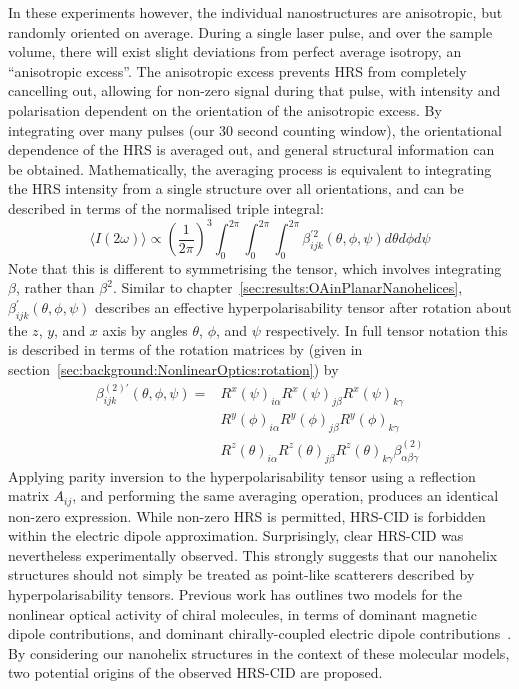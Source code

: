 In these experiments however, the individual nanostructures are anisotropic, but randomly oriented on average. During a single laser pulse, and over the sample volume, there will exist slight deviations from perfect average isotropy, an ``anisotropic excess''. The anisotropic excess prevents HRS from completely cancelling out, allowing for non-zero signal during that pulse, with intensity and polarisation dependent on the orientation of the anisotropic excess. By integrating over many pulses (our 30 second counting window), the orientational dependence of the HRS is averaged out, and general structural information can be obtained.
Mathematically, the averaging process is equivalent to integrating the HRS intensity from a single structure over all orientations, and can be described in terms of the normalised triple integral:
\begin{equation}
    \langle I(2\omega) \rangle \propto
    \left(\frac{1}{2\pi}\right)^3
    \int_{0}^{2\pi} \int_{0}^{2\pi} \int_{0}^{2\pi}
    \beta_{ijk} ^{\prime 2} (\theta, \phi, \psi)
    d\theta d\phi d\psi
\end{equation}
Note that this is different to symmetrising the tensor, which involves integrating $\beta$, rather than $\beta^{2}$. Similar to chapter~\ref{sec:results:OAinPlanarNanohelices}, $\beta_{ijk}^{\prime} (\theta, \phi, \psi)$ describes an effective hyperpolarisability tensor after rotation about the $z$, $y$, and $x$ axis by angles $\theta$, $\phi$, and $\psi$ respectively. In full tensor notation this is described in terms of the rotation matrices by (given in section~\ref{sec:background:NonlinearOptics:rotation}) by
\begin{equation}
    \begin{split}
        \beta_{ijk}^{(2) \prime} (\theta, \phi, \psi) =
        & R^{x}(\psi)_{i\alpha}R^{x}(\psi)_{j\beta}R^{x}(\psi)_{k\gamma} \\
        & R^{y}(\phi)_{i\alpha}R^{y}(\phi)_{j\beta}R^{y}(\phi)_{k\gamma} \\
        & R^{z}(\theta)_{i\alpha}R^{z}(\theta)_{j\beta}R^{z}(\theta)_{k\gamma}
        \beta_{\alpha \beta \gamma}^{(2)}
    \end{split}
\end{equation}
Applying parity inversion to the hyperpolarisability tensor using a reflection matrix $A_{ij}$, and performing the same averaging operation, produces an identical non-zero expression. While non-zero HRS is permitted, HRS-CID is forbidden within the electric dipole approximation. Surprisingly, clear HRS-CID was nevertheless experimentally observed. This strongly suggests that our nanohelix structures should not simply be treated as point-like scatterers described by hyperpolarisability tensors. Previous work has outlines two models for the nonlinear optical activity of chiral molecules, in terms of dominant magnetic dipole contributions, and dominant chirally-coupled electric dipole contributions~\cite{Fischer2005a}. By considering our nanohelix structures in the context of these molecular models, two potential origins of the observed HRS-CID are proposed.

